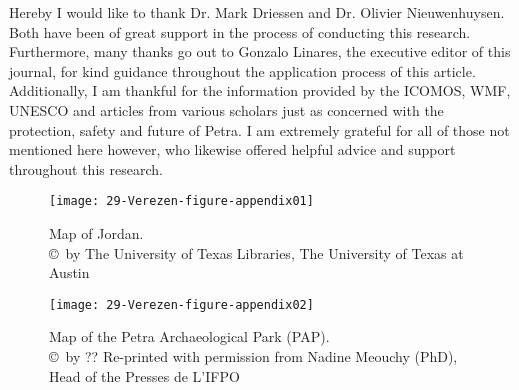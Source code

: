 Hereby  I would like to thank Dr. Mark Driessen and Dr. Olivier Nieuwenhuysen. Both have been of great support in the process of conducting this research. Furthermore, many thanks go out to Gonzalo Linares, the executive editor of this journal, for kind guidance throughout the application process of this article. Additionally, I am thankful for the information provided by the ICOMOS, WMF, UNESCO and articles from various scholars just as concerned with the protection, safety and future of Petra. I am extremely grateful for all of those not mentioned here however, who likewise offered helpful advice and support throughout this research.

\IJSRAseparator
\begin{figure}[!htb]
	\texttt{[image: 29-Verezen-figure-appendix01]}
	\caption{Map of Jordan.
		{\normalfont\scriptsize \\ \copyright\ by The University of Texas Libraries, The University of Texas at Austin
	}}
	\label{fig:29-Verezen-figure-appendix01}
\end{figure}

\begin{figure}[!htb]
	\texttt{[image: 29-Verezen-figure-appendix02]}
	\caption{Map of the Petra Archaeological Park (PAP).
		{\normalfont\scriptsize \\ \copyright\ by ?? Re-printed with permission from Nadine Meouchy (PhD), Head of the Presses de L’IFPO
	}}
	\label{fig:29-Verezen-figure-appendix02}
\end{figure}

\clearpage
\IJSRAclosing%